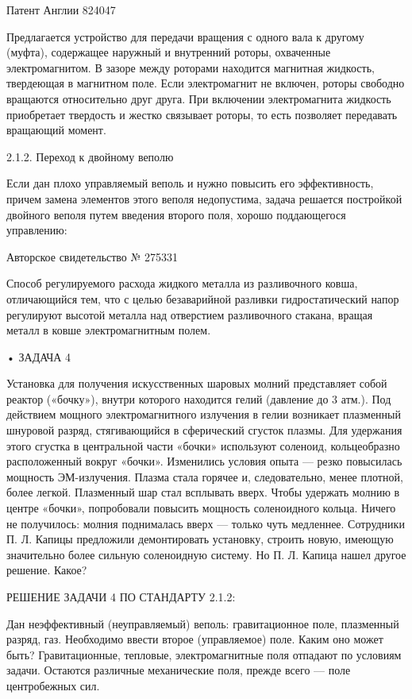 Патент Англии 824047

Предлагается  устройство  для  передачи   вращения  с  одного  вала  к
другому (муфта),  содержащее наружный и внутренний  роторы, охваченные
электромагнитом. В зазоре между роторами находится магнитная жидкость,
твердеющая   в  магнитном   поле.  Если   электромагнит  не   включен,
роторы  свободно  вращаются  относительно друг  друга.  При  включении
электромагнита  жидкость  приобретает  твердость  и  жестко  связывает
роторы, то есть позволяет передавать вращающий момент.


2.1.2. Переход к двойному веполю

Если дан плохо управляемый веполь  и нужно повысить его эффективность,
причем  замена элементов  этого  веполя  недопустима, задача  решается
постройкой  двойного  веполя  путем   введения  второго  поля,  хорошо
поддающегося управлению:


Авторское свидетельство № 275331

Способ регулируемого  расхода жидкого  металла из  разливочного ковша,
отличающийся тем,  что с целью безаварийной  разливки гидростатический
напор регулируют высотой металла  над отверстием разливочного стакана,
вращая металл в ковше электромагнитным полем.


• ЗАДАЧА 4

Установка  для  получения  искусственных шаровых  молний  представляет
собой реактор («бочку»), внутри  которого находится гелий (давление до
3  атм.). Под  действием мощного  электромагнитного излучения  в гелии
возникает  плазменный  шнуровой  разряд, стягивающийся  в  сферический
сгусток  плазмы.  Для  удержания  этого сгустка  в  центральной  части
«бочки»  используют   соленоид,  кольцеобразно   расположенный  вокруг
«бочки».  Изменились   условия  опыта  —  резко   повысилась  мощность
ЭМ-излучения. Плазма  стала горячее  и, следовательно,  менее плотной,
более  легкой. Плазменный  шар  стал всплывать  вверх. Чтобы  удержать
молнию в  центре «бочки»,  попробовали повысить  мощность соленоидного
кольца. Ничего не  получилось: молния поднималась вверх  — только чуть
медленнее. Сотрудники П. Л. Капицы предложили демонтировать установку,
строить новую, имеющую значительно  более сильную соленоидную систему.
Но П. Л. Капица нашел другое решение. Какое?


РЕШЕНИЕ ЗАДАЧИ 4 ПО СТАНДАРТУ 2.1.2:

Дан   неэффективный  (неуправляемый)   веполь:  гравитационное   поле,
плазменный разряд,  газ. Необходимо ввести второе  (управляемое) поле.
Каким оно может быть?  Гравитационные, тепловые, электромагнитные поля
отпадают  по условиям  задачи. Остаются  различные механические  поля,
прежде всего — поле центробежных сил.


